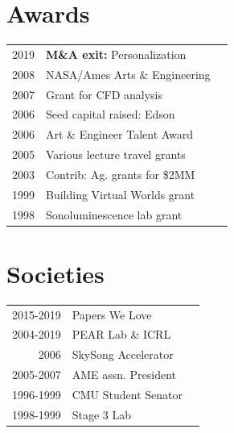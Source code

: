 \documentclass[letterpaper]{deedy-resume} %
\begin{document}
\begin{minipage}[t]{0.33\textwidth} %


\section{Awards}

\begin{tabular}{rll}
2019 & \textbf{M\&A exit:} Personalization\\
2008 & NASA/Ames Arts \& Engineering\\
2007 & Grant for CFD analysis\\
2006 & Seed capital raised: Edson\\
2006 & Art \& Engineer Talent Award\\
2005 & Various lecture travel grants\\
2003 & Contrib: Ag. grants for \$2MM\\
1999 & Building Virtual Worlds grant\\
1998 & Sonoluminescence lab grant\\
\end{tabular}

\sectionspace %


\section{Societies}

\begin{tabular}{rll}
2015-2019 & Papers We Love\\
2004-2019 & PEAR Lab \& ICRL\\
2006 & SkySong Accelerator\\
2005-2007 & AME assn. President\\
1996-1999 & CMU Student Senator\\
1998-1999 & Stage 3 Lab\\
\end{tabular}

\sectionspace %



\end{minipage}
\end{document}
